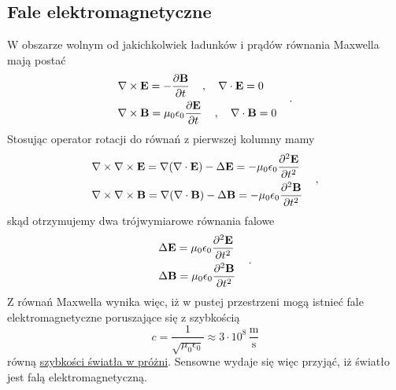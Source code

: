 \documentclass[../main.tex]{subfiles}
\begin{document}
\subsection{Fale elektromagnetyczne}
W obszarze wolnym od jakichkolwiek ładunków i prądów równania Maxwella mają postać
\begin{equation*}
    \begin{split}
        &\nabla\times\mathbf{E}=-\pdv{\mathbf{B}}{t}\quad\,,\quad\nabla\cdot\mathbf{E}=0\\
        &\nabla\times\mathbf{B}=\mu_0\epsilon_0\pdv{\mathbf{E}}{t}\quad\,,\quad\nabla\cdot\mathbf{B}=0
    \end{split}\quad\,.
\end{equation*}
Stosując operator rotacji do równań z pierwszej kolumny mamy
\begin{equation*}
\begin{split}
    &\nabla\times\nabla\times\mathbf{E}=\nabla(\nabla\cdot\mathbf{E})-\Delta\mathbf{E}=-\mu_0\epsilon_0\pdv[2]{\mathbf{E}}{t}\\
    &\nabla\times\nabla\times\mathbf{B}=\nabla(\nabla\cdot\mathbf{B})-\Delta\mathbf{B}=-\mu_0\epsilon_0\pdv[2]{\mathbf{B}}{t}
\end{split}\quad\,,
\end{equation*}
skąd otrzymujemy dwa trójwymiarowe równania falowe
\begin{equation*}
    \begin{split}
        &\Delta\mathbf{E}=\mu_0\epsilon_0\pdv[2]{\mathbf{E}}{t}\\
        &\Delta\mathbf{B}=\mu_0\epsilon_0\pdv[2]{\mathbf{B}}{t}
    \end{split}\quad\,.
\end{equation*}
Z równań Maxwella wynika więc, iż w pustej przestrzeni mogą istnieć fale elektromagnetyczne
poruszające się z szybkością
\begin{equation*}
    c=\frac{1}{\sqrt{\mu_0\epsilon_0}}\approx 3\cdot10^8\,\frac{\text{m}}{\text{s}}
\end{equation*}
równą \underline{szybkości światła w próżni}. Sensowne wydaje się więc przyjąć, iż światło jest falą
elektromagnetyczną.
\end{document}
